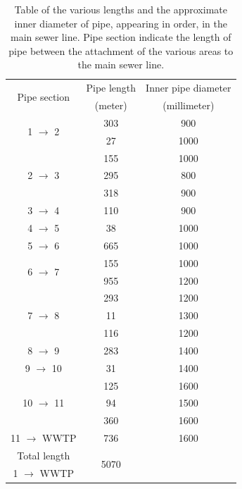 \begin{table} 
\centering
\begin{tabular}[H]{|c|c|c|} \hline

\multirow{2}{*}{Pipe section} & Pipe length & Inner pipe diameter \\ 
							  & (meter)		& (millimeter)		\\ \hline
\multirow{2}{*}{1 $\rightarrow$ 2}		  & 303			  & 900	\\
						 & 27			  & 1000 \\ \hline
						 & 155			  & 1000 \\
2 $\rightarrow$ 3		 & 295			  & 800  \\
			 			 & 318			  & 900 \\ \hline
3 $\rightarrow$ 4		 & 110			  & 900 \\ \hline
4 $\rightarrow$ 5		 & 38 			  & 1000 \\ \hline
5 $\rightarrow$ 6		 & 665			  & 1000 \\ \hline
\multirow{2}{*}{6 $\rightarrow$ 7}		 & 155			  & 1000 \\
			 			 & 955			  & 1200 \\ \hline
 						 & 293			  & 1200 \\
7 $\rightarrow$ 8		 & 11 			  & 1300 \\
			 			 & 116			  & 1200 \\ \hline
8 $\rightarrow$ 9		 & 283			  & 1400 \\ \hline
9 $\rightarrow$ 10		 & 31			  & 1400 \\ \hline
						 & 125			  & 1600 \\
10 $\rightarrow$ 11	 	 & 94			  & 1500 \\
						 & 360 			  & 1600 \\ \hline
11 $\rightarrow$ WWTP    & 736			  & 1600 \\ \hline
Total length 		     & \multirow{2}{*}{5070}  &		 \\ 
1 $\rightarrow$ WWTP     &						  & \\ \hline

\end{tabular}

\caption{Table of the various lengths and the approximate inner diameter of pipe, appearing in order, in the main sewer line. Pipe section indicate the length of pipe between the attachment of the various areas to the main sewer line.} 
\label{tab:kloak_diameter}
\end{table}